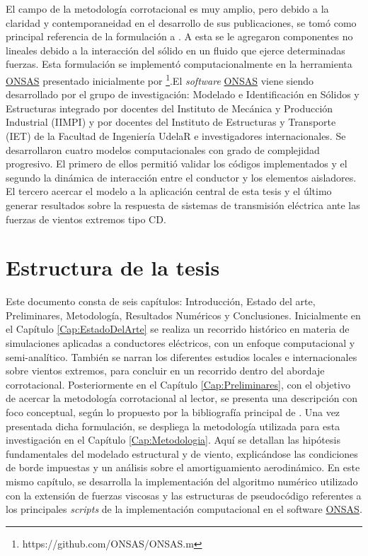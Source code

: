 El campo de la metodología corrotacional es muy amplio, pero debido a la claridad y contemporaneidad en el desarrollo de sus publicaciones, se tomó como principal referencia de la formulación a \cite{Le2014}. A esta se le agregaron componentes no lineales debido a la interacción del sólido en un fluido que ejerce determinadas fuerzas. Esta formulación se implementó computacionalmente en la herramienta \href{https://github.com/ONSAS/ONSAS.m}{ONSAS} presentado inicialmente por \cite{bruno2017introduccion} \footnote{https://github.com/ONSAS/ONSAS.m}.El \emph{software} \href{https://github.com/ONSAS/ONSAS.m}{ONSAS} viene siendo desarrollado por el grupo de investigación: Modelado e Identificación en Sólidos y Estructuras integrado por docentes del Instituto de Mecánica y Producción Industrial (IIMPI) y por docentes del Instituto de Estructuras y Transporte (IET) de la Facultad de Ingeniería UdelaR e investigadores internacionales. Se desarrollaron cuatro modelos computacionales con grado de complejidad progresivo. El primero de ellos permitió validar los códigos implementados y el segundo la dinámica de interacción entre el conductor y los elementos aisladores. El tercero acercar el modelo a la aplicación central de esta tesis y el último generar resultados sobre la respuesta de sistemas de transmisión eléctrica ante las fuerzas de vientos extremos tipo CD.




\section{Estructura de la tesis}

Este documento consta de seis capítulos: Introducción, Estado del arte, Preliminares, Metodología, Resultados Numéricos y Conclusiones. Inicialmente en el Capítulo \ref{Cap:EstadoDelArte} se realiza un recorrido histórico en materia de simulaciones aplicadas a conductores eléctricos, con un enfoque computacional y semi-analítico. También se narran los diferentes estudios locales e internacionales sobre vientos extremos, para concluir en un recorrido dentro del abordaje corrotacional. Posteriormente en el Capítulo \ref{Cap:Preliminares}, con el objetivo de acercar la metodología corrotacional al lector, se presenta una descripción con foco conceptual, según lo propuesto por la bibliografía principal de \citet{Le2014}. Una vez presentada dicha formulación, se despliega la metodología utilizada para esta investigación en el Capítulo \ref{Cap:Metodologia}. Aquí se detallan las hipótesis fundamentales del modelado estructural y de viento, explicándose las condiciones de borde impuestas y un análisis sobre el amortiguamiento aerodinámico. En este mismo capítulo, se desarrolla la implementación del algoritmo numérico utilizado con la extensión de fuerzas viscosas y las estructuras de pseudocódigo referentes a los principales \textit{scripts} de la implementación computacional en el software \href{https://github.com/ONSAS/ONSAS/}{ONSAS}. 


